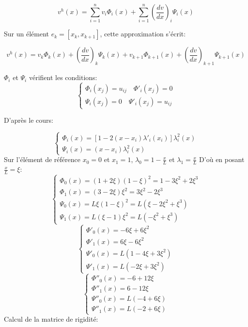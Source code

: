 \documentclass[a4paper]{article}
\begin{document}
\begin{displaymath}
v^{h}(x)=\sum_{i=1}^{n}v_{i}\Phi_{i}(x)+\sum_{i=1}^{n}(\frac{dv}{dx})_{i}\Psi_{i}(x)\end{displaymath}

Sur un élément $e_{k}=[x_{k},x_{k+1}]$, cette approximation s'écrit:



\begin{displaymath}
v^{h}(x)=v_{k}\Phi_{k}(x)+(\frac{dv}{dx})_{k}\Psi_{k}(x)+v_{k+1}\Phi_{k+1}(x)+(\frac{dv}{dx})_{k+1}\Psi_{k+1}(x)\end{displaymath}

$\Phi_{i}$ et $\Psi_i$ vérifient les conditions:
\[\left\{\begin{array}{l}
\Phi_{i}(x_j)=u _{ij}\quad \Phi'_{i}(x_j)=0\\
\Psi_{i}(x_j)=0\quad \Psi'_{i}(x_j)=u _{ij}
\end{array} \right. \]

D'après le cours:

\[\left\{\begin{array}{l}
\Phi_i(x) = \left[1-2(x-x_i)\lambda'_i(x_i)\right]\lambda^2_i(x) \\
\Psi_i(x) = (x-x_i)\lambda^2_i(x) 
\end{array}\right.
 \]
Sur l'élément de référence $x_0=0$ et $x_1=1$, $\lambda_0=1-\frac{x}{L}$ et $\lambda_1=\frac{x}{L}$
D'où en posant $\frac{x}{L}=\xi$:
\[\left\{\begin{array}{l}
\Phi_0(x) = (1+2\xi)(1-\xi)^2 =1-3\xi^2+2\xi^3\\
\Phi_1(x) = (3-2\xi)\xi^2 =3\xi^2-2\xi^3\\
\Psi_0(x) = L \xi(1-\xi)^2=L (\xi-2\xi^2+\xi^3)\\
\Psi_1(x) = L (\xi-1)\xi^2=L(-\xi^2 +\xi^3)
\end{array}\right.
 \]
\[\left\{\begin{array}{l}
\Phi'_0(x) = -6\xi+6\xi^2\\
\Phi'_1(x) = 6\xi-6\xi^2\\
\Psi'_0(x) = L(1-4\xi+3\xi^2)\\
\Psi'_1(x) = L(-2\xi+3\xi^2)
\end{array}\right.
 \]
 \[\left\{\begin{array}{l}
\Phi''_0(x) = -6+12\xi\\
\Phi''_1(x) = 6-12\xi\\
\Psi''_0(x) = L(-4+6\xi)\\
\Psi''_1(x) = L(-2+6\xi)
\end{array}\right.
 \]
 Calcul de la matrice de rigidité:
 
\end{document}
